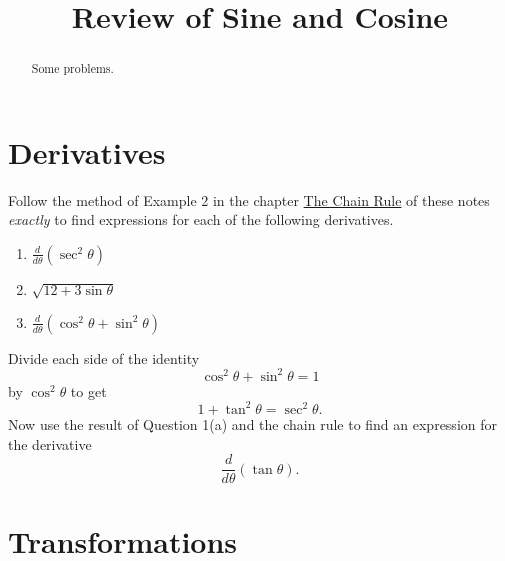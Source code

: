 \documentclass{ximera}
\title{Review of Sine and Cosine}
\begin{document}
\begin{abstract}
Some problems.
\end{abstract}
\maketitle


\section{Derivatives}

\begin{question} \label{QPodRERE}

Follow the method of Example 2 in the chapter \href{https://ximera.osu.edu/calcone2025master/Calculus1/ChainRule/ChainRule}{The Chain Rule} of these notes \emph{exactly} to find expressions for each of the following derivatives.

\begin{enumerate}
\item  $\frac{d}{d\theta}\left(  \sec^2\theta \right)$

\item $\sqrt{12 + 3\sin\theta}$

\item $\frac{d}{d\theta} \left( \cos^2\theta + \sin^2\theta  \right)$

\end{enumerate}

\end{question}


\begin{question} \label{QKDFL43rr4r}
Divide each side of the identity
\[
  \cos^2\theta + \sin^2\theta = 1
\]
by $\cos^2\theta$ to get
\[
  1 + \tan^2\theta = \sec^2\theta.
\]
Now use the result of Question 1(a) and the chain rule to find an expression for the derivative
\[
    \frac{d}{d\theta} \left(  \tan\theta \right) .
\]
\end{question}




\section{Transformations}
\end{document}
